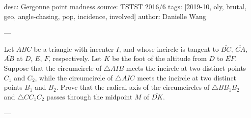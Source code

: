 desc: Gergonne point madness
source: TSTST 2016/6
tags: [2019-10, oly, brutal, geo, angle-chasing, pop, incidence, involved]
author: Danielle Wang

---

Let $ABC$ be a triangle with incenter $I$, and whose incircle is tangent to $\overline{BC}$, $\overline{CA}$, $\overline{AB}$ at $D$, $E$, $F$, respectively. Let $K$ be the foot of the altitude from $D$ to $\overline{EF}$. Suppose that the circumcircle of $\triangle AIB$ meets the incircle at two distinct points $C_1$ and $C_2$, while the circumcircle of $\triangle AIC$ meets the incircle at two distinct points $B_1$ and $B_2$. Prove that the radical axis of the circumcircles of $\triangle BB_1B_2$ and $\triangle CC_1C_2$ passes through the midpoint $M$ of $\overline{DK}$.

---

